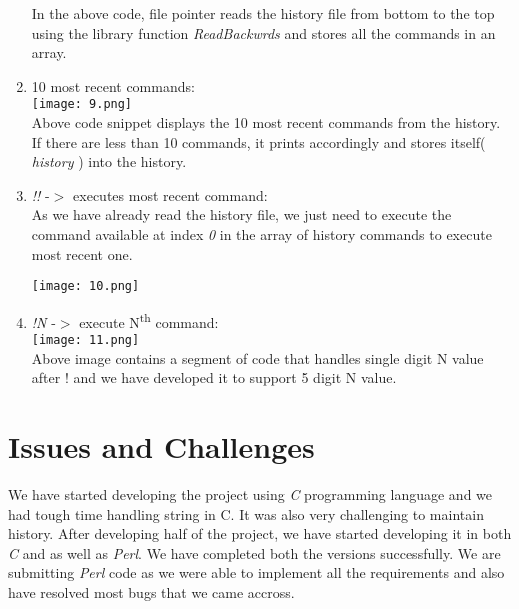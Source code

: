 \documentclass[12pt,twoside]{article}
\begin{document}
\begin{enumerate}
In the above code, file pointer reads the history file from bottom to the top using the library function \emph{ReadBackwrds} and stores all the commands in an array.

    \item 10 most recent commands:\\
\hfill \break
\texttt{[image: 9.png]}\\
\hfill \break
Above code snippet displays the 10 most recent commands from the history. If there are less than 10 commands, it prints accordingly and stores itself( \emph{history} ) into the history.\\

    \item \emph{!!} -$>$ executes most recent command:\\
As we have already read the history file, we just need to execute the command available at index \emph{0} in the array of history commands to execute most recent one.\\
\hfill \break
\hfill \break
\hfill \break
\hfill \break
\hfill \break
\hfill \break
\hfill \break

\texttt{[image: 10.png]}\\

    \item \emph{!N} -$>$ execute N\textsuperscript{th} command:\\
\hfill \break
\texttt{[image: 11.png]}\\
\hfill \break
Above image contains a segment of code that handles single digit N value after ! and we have developed it to support 5 digit N value.\\
\hfill \break
\hfill \break
\hfill \break
\hfill \break



\end{enumerate}



\section{Issues and Challenges}
We have started developing the project using \emph{C} programming language and we had tough time handling string in C. It was also very challenging to maintain history. After developing half of the project, we have started developing it in both \emph{C} and as well as \emph{Perl}. We have completed both the versions successfully. We are submitting \emph{Perl} code as we were able to implement all the requirements and also have resolved most bugs that we came accross.
\end{document}

